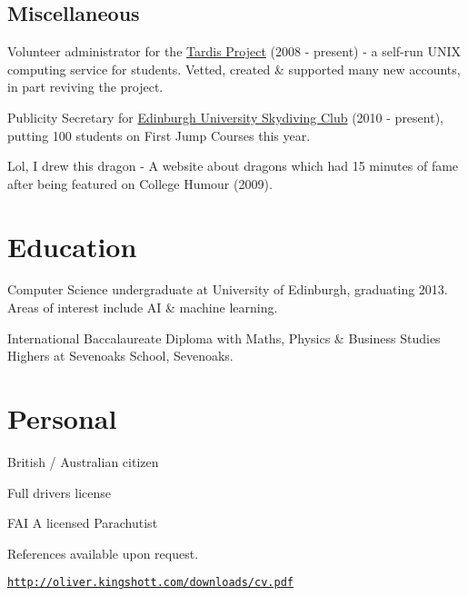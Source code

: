 \documentclass[a4paper]{article}
\def\footerlink{http://oliver.kingshott.com/downloads/cv.pdf}
\renewenvironment{itemize}{
  \begin{list}{}{
    \setlength{\leftmargin}{1.5em}
  }
}{
  \end{list}
}
\begin{document}
\subsection*{Miscellaneous}
\begin{itemize}
\item Volunteer administrator for the \href{http://www.tardis.ed.ac.uk/}{Tardis Project} (2008 - present) - a self-run UNIX computing service for students. Vetted, created \& supported many new accounts, in part reviving the project.
\item Publicity Secretary for \href{http://facebook.com/getjumped/}{Edinburgh University Skydiving Club} (2010 - present), putting 100 students on First Jump Courses this year.
\item Lol, I drew this dragon - A website about dragons which had 15 minutes of fame after being featured on College Humour (2009).
\end{itemize}

\section*{Education}
\begin{itemize}
  \item Computer Science undergraduate at University of Edinburgh, graduating 2013. Areas of interest include AI \& machine learning.
  \item International Baccalaureate Diploma with Maths, Physics \& Business Studies Highers at Sevenoaks School, Sevenoaks.
\end{itemize}

\section*{Personal}

\begin{itemize}
\item British / Australian citizen
\item Full drivers license
\item FAI A licensed Parachutist
\item References available upon request.
\end{itemize}

\bigskip

\begin{center}
  \begin{footnotesize}
    \href{\footerlink}{\texttt{\footerlink}}
  \end{footnotesize}
\end{center}
\end{document}
